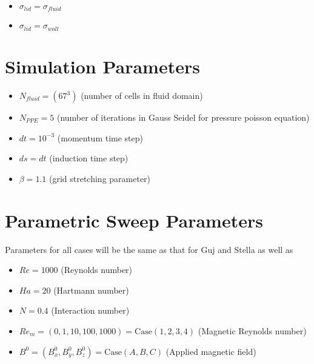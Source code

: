\documentclass[11pt]{article}
\begin{document}
\begin{itemize}
\item $\sigma_{lid} = \sigma_{fluid}$
\item $\sigma_{lid} = \sigma_{wall}$
\end{itemize}

\section{Simulation Parameters}

\begin{itemize}
\item $N_{fluid} = (67^3)$ (number of cells in fluid domain)
\item $N_{PPE} = 5$ (number of iterations in Gauss Seidel for pressure poisson equation)
\item $dt = 10^{-3}$ (momentum time step)
\item $ds = dt$ (induction time step)
\item $\beta = 1.1$ (grid stretching parameter)
\end{itemize}

\section{Parametric Sweep Parameters}

Parameters for all cases will be the same as that for Guj and Stella as well as
\begin{itemize}
\item $Re = 1000$ (Reynolds number)
\item $Ha = 20$ (Hartmann number)
\item $N = 0.4$ (Interaction number)
\item $Re_m = (0,1,10,100,1000) = \text{Case} (1,2,3,4)$ (Magnetic Reynolds number)
\item $B^0 = (B^0_x,B^0_y,B^0_z) = \text{Case} (A,B,C)$ (Applied magnetic field)
\end{itemize}
\end{document}
